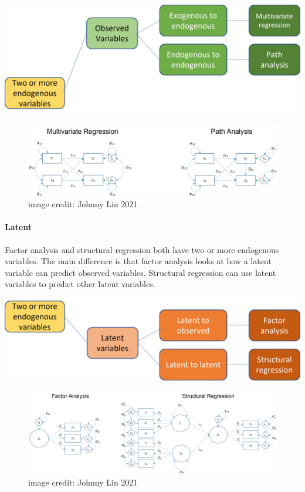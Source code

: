 \documentclass[
]{article}
\begin{document}
\includegraphics{SEMs 2 observed.png}

\begin{figure}
\centering
\includegraphics{MultRegresAndPathAn.png}
\caption{image credit: Johnny Lin 2021}
\end{figure}

\hypertarget{latent}{%
\paragraph{Latent}\label{latent}}

Factor analysis and structural regression both have two or more
endogenous variables. The main difference is that factor analysis looks
at how a latent variable can predict observed variables. Structural
regression can use latent variables to predict other latent variables.

\includegraphics{SEMs 2 latent.png}

\begin{figure}
\centering
\includegraphics{FacAnAndStrReg.png}
\caption{image credit: Johnny Lin 2021}
\end{figure}
\end{document}
